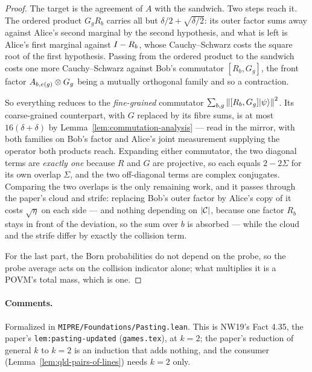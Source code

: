 \begin{proof}
\leanok
{}
The target is the agreement of $A$ with the sandwich. Two steps reach it. The ordered product
$G_g R_b$ carries all but $\delta/2 + \sqrt{\delta/2}$: its outer factor sums away against
Alice's second marginal by the second hypothesis, and what is left is Alice's first marginal
against $I - R_b$, whose Cauchy--Schwarz costs the square root of the first hypothesis. Passing
from the ordered product to the sandwich costs one more Cauchy--Schwarz against Bob's commutator
$[R_b, G_g]$, the front factor $A_{b, e(g)} \otimes G_g$ being a mutually orthogonal family and so a
contraction.

So everything reduces to the \emph{fine-grained} commutator $\sum_{b, g} \left\| {[R_b, G_g]
|\psi\rangle} \right\|^2$. Its coarse-grained counterpart, with $G$ replaced by its fibre sums, is at most
$16(\delta + \delta)$ by Lemma~\ref{lem:commutation-analysis} --- read in the mirror, with both
families on Bob's factor and Alice's joint measurement supplying the operator both products reach.
Expanding either commutator, the two diagonal terms are \emph{exactly one} because $R$ and $G$ are
projective, so each equals $2 - 2\Sigma$ for its own overlap $\Sigma$, and the two off-diagonal
terms are complex conjugates. Comparing the two overlaps is the only remaining work, and it passes
through the paper's cloud and strife: replacing Bob's outer factor by Alice's copy of it costs
$\sqrt\eta$ on each side --- and nothing depending on $|\mathcal{C}|$, because one factor $R_b$
stays in front of the deviation, so the sum over $b$ is absorbed --- while the cloud and the strife
differ by exactly the collision term.

For the last part, the Born probabilities do not depend on the probe, so the probe average acts on
the collision indicator alone; what multiplies it is a POVM's total mass, which is one.
\end{proof}

\paragraph{Comments.} Formalized in \texttt{MIPRE/Foundations/Pasting.lean}. This is NW19's
Fact 4.35, the paper's \texttt{lem:pasting-updated} (\texttt{games.tex}), at $k = 2$; the paper's
reduction of general $k$ to $k = 2$ is an induction that adds nothing, and the consumer
(Lemma~\ref{lem:qld-pairs-of-lines}) needs $k = 2$ only.

